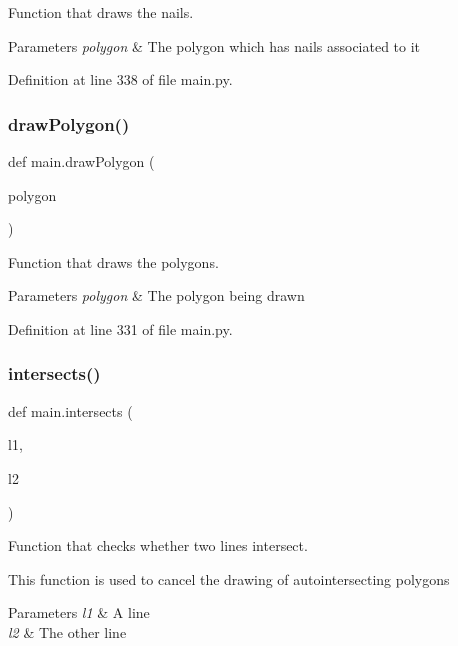 Function that draws the nails. 


\begin{DoxyParams}{Parameters}
{\em polygon} & The polygon which has nails associated to it \\
\hline
\end{DoxyParams}


Definition at line 338 of file main.\+py.

\mbox{\label{namespacemain_a923e8cecbed43bf133611a409c40c107}} 
\subsubsection{\texorpdfstring{draw\+Polygon()}{drawPolygon()}}
{\footnotesize\ttfamily def main.\+draw\+Polygon (\begin{DoxyParamCaption}\item[{}]{polygon }\end{DoxyParamCaption})}



Function that draws the polygons. 


\begin{DoxyParams}{Parameters}
{\em polygon} & The polygon being drawn \\
\hline
\end{DoxyParams}


Definition at line 331 of file main.\+py.

\mbox{\label{namespacemain_afa0ac21cfc8ed3c2c3cfddd6ea6899b6}} 
\subsubsection{\texorpdfstring{intersects()}{intersects()}}
{\footnotesize\ttfamily def main.\+intersects (\begin{DoxyParamCaption}\item[{}]{l1,  }\item[{}]{l2 }\end{DoxyParamCaption})}



Function that checks whether two lines intersect. 

This function is used to cancel the drawing of autointersecting polygons 
\begin{DoxyParams}{Parameters}
{\em l1} & A line \\
\hline
{\em l2} & The other line \\
\hline
\end{DoxyParams}


